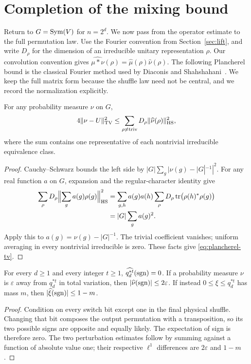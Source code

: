 \section{Completion of the mixing bound}\label{sec:completion}

Return to $G=\operatorname{Sym}(V)$ for $n=2^d$. We now pass from the operator estimate
to the full permutation law.
Use the Fourier convention from Section~\ref{sec:lift}, and write
$D_\rho$ for the dimension of an irreducible unitary representation
$\rho$. Our convolution convention gives
$\widehat{\mu*\nu}(\rho)=\widehat\mu(\rho)\widehat\nu(\rho)$.
The following Plancherel bound is the classical Fourier method used by
Diaconis and Shahshahani~\cite{DiaconisShahshahani1981}. We keep the
full matrix form because the shuffle law need not be central, and we
record the normalization explicitly.

\begin{lemma}\label{lem:plancherel}
For any probability measure $\nu$ on $G$,
\begin{equation}\label{eq:plancherel-tv}
 4\|\nu-U\|_{\mathrm{TV}}^2
 \le\sum_{\rho\ne\mathrm{triv}}D_\rho
       \|\widehat\nu(\rho)\|_{\mathrm{HS}}^2,
\end{equation}
where the sum contains one representative of each nontrivial irreducible
equivalence class.
\end{lemma}
\begin{proof}
Cauchy--Schwarz bounds the left side by
$|G|\sum_g|\nu(g)-|G|^{-1}|^2$.
For any real function $a$ on $G$, expansion and the regular-character
identity give
\begin{align*}
 \sum_\rho D_\rho\Bigl\|\sum_g a(g)\rho(g)\Bigr\|_{\mathrm{HS}}^2
 &=\sum_{g,h}a(g)a(h)
   \sum_\rho D_\rho\operatorname{tr}\bigl(\rho(h)^*\rho(g)\bigr)\\
 &=|G|\sum_g a(g)^2.
\end{align*}
Apply this to $a(g)=\nu(g)-|G|^{-1}$. The trivial coefficient vanishes;
uniform averaging in every nontrivial irreducible is zero. These facts
give \eqref{eq:plancherel-tv}.
\end{proof}

\begin{lemma}\label{lem:fair-sign}
For every $d\ge1$ and every integer $t\ge1$,
$\widehat{q_d^{*t}}(\operatorname{sgn})=0$. If a probability measure $\nu$ is
$\varepsilon$ away from $q_d^{*t}$ in total variation, then
$|\widehat\nu(\operatorname{sgn})|\le2\varepsilon$. If instead
$0\le\xi\le q_d^{*t}$ has mass $m$, then
$|\widehat\xi(\operatorname{sgn})|\le1-m$.
\end{lemma}
\begin{proof}
Condition on every switch bit except one in the final physical shuffle.
Changing that bit composes the output permutation with a transposition,
so its two possible signs are opposite and equally likely. The
expectation of sign is therefore zero. The two perturbation estimates
follow by summing against a function of absolute value one; their
respective $\ell^1$ differences are $2\varepsilon$ and $1-m$.
\end{proof}

